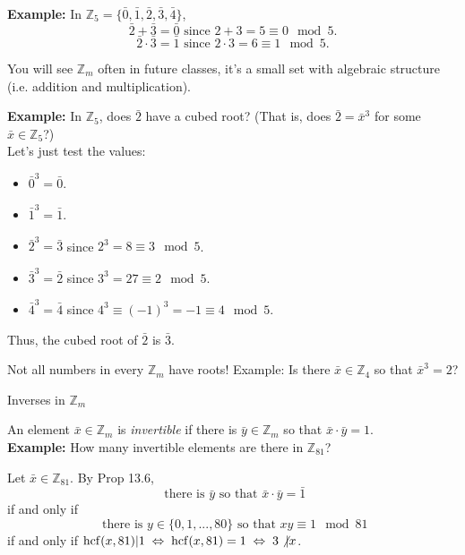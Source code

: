\documentclass[11pt,dvipsnames]{book}
\def\hcf{{\rm hcf}}
\numberwithin{equation}{section} %
\numberwithin{figure}{section} %
\numberwithin{table}{section} %
\begin{document}
\begin{exercise}
{\bf Example:}   In $\mathbb{Z}_{5}=\{\bar{0},\bar{1},\bar{2},\bar{3},\bar{4}\}$, 
\[
\bar{2}+\bar{3} = \bar{0} \mbox{ since } 2+3=5\equiv 0 \mod 5.
\] 
\[
\bar{2}\cdot \bar{3} = \bar{1} \mbox{ since } 2\cdot 3=6\equiv 1 \mod 5.
\]
 
You will see $\mathbb{Z}_{m}$ often in future classes, it's a small set with algebraic structure (i.e. addition and multiplication).



{\bf Example:}  In $\mathbb{Z}_{5}$, does $\bar{2}$ have a cubed root?  (That is, does $\bar{2}=\bar{x}^{3}$ for some $\bar{x}\in \mathbb{Z}_{5}$?)\\  
\vspace{10pt}
Let's just test the values: 

\begin{itemize}
\item $\bar{0}^{3}=\bar{0}$. 
\item $\bar{1}^{3}=\bar{1}$. 
\item $\bar{2}^{3}=\bar{3}$ since $2^{3} = 8\equiv 3\mod 5$.  
\item $\bar{3}^{3}=\bar{2}$ since $3^{3} = 27\equiv 2\mod 5$.  
\item $\bar{4}^{3}=\bar{4}$ since $4^{3}\equiv (-1)^{3}=-1\equiv 4 \mod 5$.  
\end{itemize}
Thus, the cubed root of $\bar{2}$ is $\bar{3}$. \\
\vspace{10pt}
 
Not all numbers in every $\mathbb{Z}_{m}$ have roots! Example: Is there $\bar{x}\in \mathbb{Z}_{4}$ so that $\bar{x}^{3}=2$?




{Inverses in $\mathbb{Z}_{m}$}
 
An element $\bar{x}\in \mathbb{Z}_{m}$ is {\it invertible} if there is $\bar{y}\in \mathbb{Z}_{m}$ so that $\bar{x}\cdot \bar{y}=1$. \\

\vspace{10pt}
{\bf Example:}  How many invertible elements are there in $\mathbb{Z}_{81}$? 
\vspace{10pt}

Let $\bar{x}\in \mathbb{Z}_{81}$. By Prop 13.6, 
\[
\mbox{ there is $\bar{y}$ so that $\bar{x}\cdot \bar{y} =\bar{1}$}
\] 
 if and only if  
 \[
 \mbox{ there is $y\in \{0,1,...,80\}$ so that $xy\equiv 1\mod 81$}
 \] 
 if and only if $\hcf(x,81)|1      \; \Leftrightarrow   \; \hcf(x,81)=1   \; \Leftrightarrow \;  3\not|x$.  
 

\end{exercise}
\end{document}
